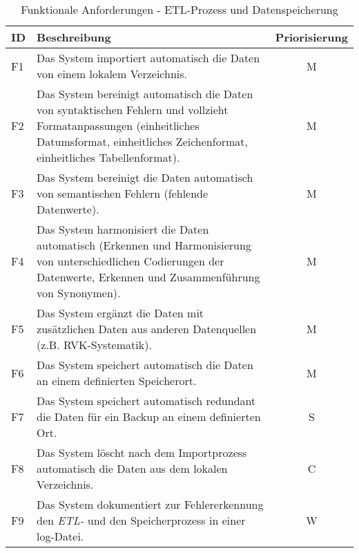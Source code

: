 \begingroup
\setlength{\tabcolsep}{10pt} %
\renewcommand{\arraystretch}{1.25}
\begin{table}[h]
    \centering
    \begin{adjustbox}{max width=\textwidth}
    \begin{tabular}{lp{15cm}c}
       \toprule
       \textbf{ID}          & \textbf{Beschreibung} &\textbf{Priorisierung}\\
       \midrule
        F1                              &Das System importiert automatisch die Daten von einem lokalem Verzeichnis. & M\\
        F2                              &Das System bereinigt automatisch die Daten von syntaktischen Fehlern und vollzieht Formatanpassungen (einheitliches Datumsformat, einheitliches Zeichenformat, einheitliches Tabellenformat). & M \\
        F3                              &Das System bereinigt die Daten automatisch von semantischen Fehlern (fehlende Datenwerte). & M \\
        F4                              &Das System harmonisiert die Daten automatisch (Erkennen und Harmonisierung von unterschiedlichen Codierungen der Datenwerte, Erkennen und Zusammenführung von Synonymen). & M \\
        F5                              &Das System ergänzt die Daten mit zusätzlichen Daten aus anderen Datenquellen (z.B. RVK-Systematik). & M \\
        F6                             &Das System speichert automatisch die Daten an einem definierten Speicherort.  & M\\
        F7                              &Das System speichert automatisch redundant die Daten für ein Backup an einem definierten Ort.  & S\\
        F8                              &Das System löscht nach dem Importprozess automatisch die Daten aus dem lokalen Verzeichnis.  & C\\
        F9                              &Das System dokumentiert zur Fehlererkennung den \textit{\acrshort{ETL}-} und den Speicherprozess in einer log-Datei. & W\\
    \bottomrule
    \end{tabular}
    \end{adjustbox}
    \caption{%
        Funktionale Anforderungen - ETL-Prozess und Datenspeicherung
    }
    \label{tab:funktionale Anforderungen I}
    \end{table}
\endgroup

